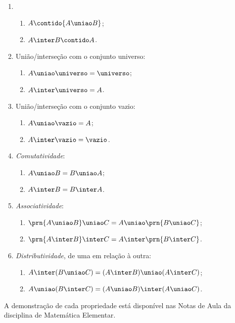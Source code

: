 \begin{enumerate}
    \item
        \begin{enumerate}
            \label{prop:uniao-e-intersecao-inclusao}
            \item
                $A \contido {A \uniao B}$;
            \item
                ${A \inter B} \contido A$.
        \end{enumerate}

    \item
        União/interseção com o conjunto universo:
        \begin{enumerate}
            \item $A \uniao \universo = \universo$;
            \item $A \inter \universo = A$.
        \end{enumerate}
    
    \item
        União/interseção com o conjunto vazio:
        \begin{enumerate}
            \item $A \uniao \vazio = A$;
            \item $A \inter \vazio = \vazio$.
        \end{enumerate}

    \item
        \emph{Comutatividade}:
        \begin{enumerate}
            \item $A \uniao B = B \uniao A$;
            \item $A \inter B = B \inter A$.
        \end{enumerate}

    \item
        \emph{Associatividade}:
        \begin{enumerate}
            \item $\prn{A \uniao B} \uniao C = A \uniao \prn{ B \uniao C}$;
            \item $\prn{A \inter B} \inter C = A \inter \prn{ B \inter C}$.
        \end{enumerate}

    \item
        \emph{Distributividade}, de uma em relação à outra:
        \begin{enumerate}
            \item $A \inter (B \uniao C) = (A \inter B) \uniao (A \inter C)$;
            \item $A \uniao (B \inter C) = (A \uniao B) \inter (A \uniao C)$.
        \end{enumerate}

\end{enumerate}

\begin{remark}
    A demonstração de cada propriedade está disponível nas Notas de Aula da disciplina de Matemática Elementar\cite[pp. 7 - 8]{notas-de-aula}.
\end{remark}